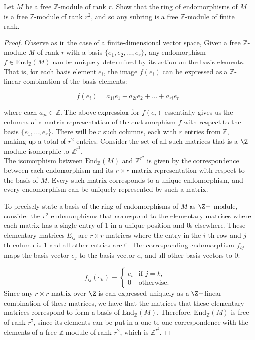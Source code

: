 \begin{lemma}
    Let $M$ be a free $\mathbb{Z}$-module of rank $r$. Show that the ring of endomorphisms of $M$ is a free $\mathbb{Z}$-module of rank $r^{2}$, and so any subring is a free $\mathbb{Z}$-module of finite rank.

    \begin{proof}
    Observe as in the case of a finite-dimensional vector space, Given a free \(\mathbb{Z}\)-module \(M\) of rank \(r\) with a basis \(\{e_1, e_2, ..., e_r\}\), any endomorphism \(f \in \text{End}_{\mathbb{Z}}(M)\) can be uniquely determined by its action on the basis elements. That is, for each basis element \(e_i\), the image \(f(e_i)\) can be expressed as a \(\mathbb{Z}\)-linear combination of the basis elements:

$$
f(e_i) = a_{1i}e_1 + a_{2i}e_2 + ... + a_{ri}e_r
$$

where each \(a_{ji} \in \mathbb{Z}\).
The above expression for \(f(e_i)\) essentially gives us the columns of a matrix representation of the endomorphism \(f\) with respect to the basis \(\{e_1, ..., e_r\}\). There will be \(r\) such columns, each with \(r\) entries from \(\mathbb{Z}\), making up a total of \(r^2\) entries. Consider the set of all such matrices that is a $\Z$ module isomorphic to \(\mathbb{Z}^{r^2}\).\\

The isomorphism between \(\text{End}_{\mathbb{Z}}(M)\) and \(\mathbb{Z}^{r^2}\) is given by the correspondence between each endomorphism and its \(r \times r\) matrix representation with respect to the basis of \(M\). Every such matrix corresponds to a unique endomorphism, and every endomorphism can be uniquely represented by such a matrix.

To precisely state a basis of the ring of endomorphisms of $M$ as $\Z-$ module, consider the \(r^2\) endomorphisms that correspond to the elementary matrices where each matrix has a single entry of 1 in a unique position and 0s elsewhere. These elementary matrices \(E_{ij}\) are \(r \times r\) matrices where the entry in the \(i\)-th row and \(j\)-th column is 1 and all other entries are 0. The corresponding endomorphism \(f_{ij}\) maps the basis vector \(e_j\) to the basis vector \(e_i\) and all other basis vectors to 0:

$$
f_{ij}(e_k) =
\begin{cases}
e_i & \text{if } j = k, \\
0 & \text{otherwise}.
\end{cases}
$$
Since any $r \times r$ matrix over $\Z$ is can expressed uniquely as a $\Z-$linear combination of these matrices, we have that the matrices that these elementary matrices correspond to form a basis of \(\text{End}_{\mathbb{Z}}(M)\).
Therefore, \(\text{End}_{\mathbb{Z}}(M)\) is free of rank \(r^2\), since its elements can be put in a one-to-one correspondence with the elements of a free \(\mathbb{Z}\)-module of rank \(r^2\), which is \(\mathbb{Z}^{r^2}\).
    \end{proof}
\end{lemma}
     


